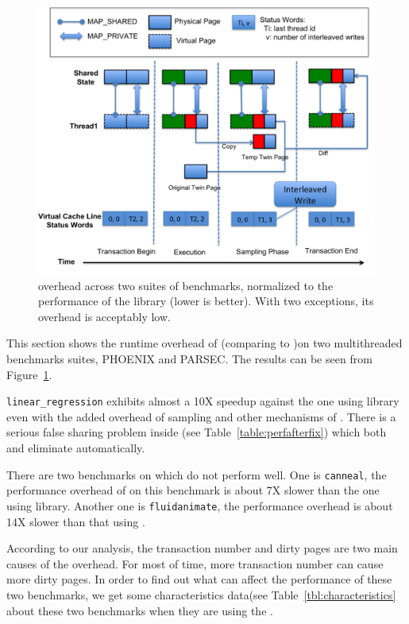 \begin{figure}[!t]
\centering
\includegraphics[width=6in]{sheriff/figure/detective.png}
\caption{\sheriffdetect{} overhead across two suites of benchmarks,
  normalized to the performance of the \pthreads{} library (lower is better). 
  With two exceptions, its overhead is acceptably low.
\label{fig:overhead}}
\end{figure}


This section shows the runtime overhead of \sheriffdetect{} (comparing to \pthreads{})on
two multithreaded benchmarks suites, PHOENIX and PARSEC.  The results
can be seen from Figure~\ref{fig:overhead}.  

\texttt{linear\_regression} exhibits almost
a 10X speedup against the one using \pthreads{} library even with the added overhead of sampling and 
other mechanisms of \sheriffdetect{}.  There is a
serious false sharing problem inside (see
Table~\ref{table:perfafterfix}) which both \sheriffdetect{} and \sheriffprotect{} eliminate
automatically. 

There are two benchmarks on which \sheriffdetect{} do not perform well. 
One is \texttt{canneal}, the performance overhead of \sheriffdetect{}
on this benchmark is about 7X slower than the one using \pthreads{}
library. Another one is \texttt{fluidanimate}, the performance overhead is about 
14X slower than that using \pthreads{}.

According to our analysis, the transaction number and dirty pages are two main causes 
of the overhead. For most of time, more transaction number can cause more dirty pages.  
In order to find out what can affect the performance of these two benchmarks, 
we get some characteristics data(see Table~\ref{tbl:characteristics} about these 
two benchmarks when they are using 
the \sheriffdetect{}.

